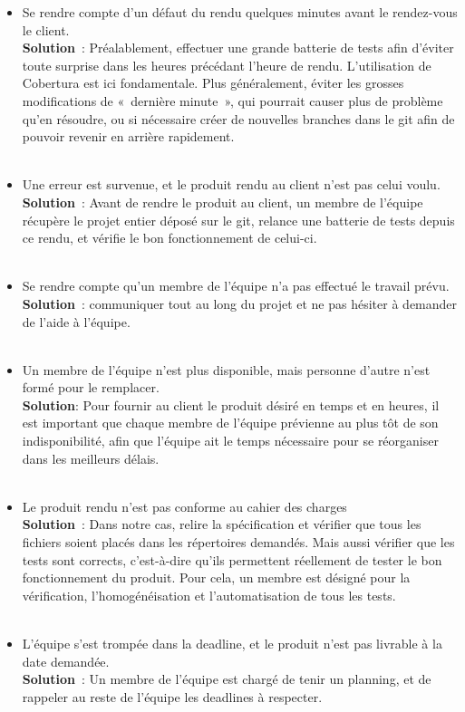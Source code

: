 \documentclass{article}
\begin{document}
\begin{itemize}
\item Se rendre compte d’un défaut du rendu quelques minutes avant le rendez-vous le client.\\
\textbf{Solution} : Préalablement, effectuer une grande batterie de tests afin d’éviter toute surprise dans les heures précédant l’heure de rendu. L’utilisation de Cobertura est ici fondamentale.
Plus généralement, éviter les grosses modifications de « dernière minute », qui pourrait causer plus de problème qu’en résoudre, ou si nécessaire créer de nouvelles branches dans le
git afin de pouvoir revenir en arrière rapidement.
\\\\
\item Une erreur est survenue, et le produit rendu au client n’est pas celui voulu.\\
\textbf{Solution} : Avant de rendre le produit au client, un membre de l’équipe récupère le projet entier déposé sur le git, relance une batterie de tests depuis ce rendu, et vérifie le bon fonctionnement de celui-ci.
\\\\
\item Se rendre compte qu’un membre de l’équipe n’a pas effectué le travail prévu.\\
\textbf{Solution} : communiquer tout au long du projet et ne pas hésiter à demander de l’aide à l’équipe.
\\\\
\item Un membre de l’équipe n’est plus disponible, mais personne d’autre n’est formé pour le remplacer.\\
\textbf{Solution}: Pour fournir au client le produit désiré en temps et en heures, il est important que chaque membre de l’équipe prévienne au plus tôt de son indisponibilité, afin que
l’équipe ait le temps nécessaire pour se réorganiser dans les meilleurs délais.
\\\\
\item Le produit rendu n’est pas conforme au cahier des charges\\
\textbf{Solution} : Dans notre cas, relire la spécification et vérifier que tous les fichiers soient placés dans les répertoires demandés. Mais aussi vérifier que les tests sont corrects,
c’est-à-dire qu’ils permettent réellement de tester le bon fonctionnement du produit. Pour cela, un membre est désigné pour la vérification, l’homogénéisation et l’automatisation de tous les tests.
\\\\
\item L’équipe s’est trompée dans la deadline, et le produit n’est pas livrable à la date demandée.\\
\textbf{Solution} : Un membre de l’équipe est chargé de tenir un planning, et de rappeler au reste de l’équipe les deadlines à respecter.
\end{itemize}
\end{document}

